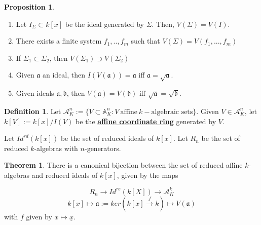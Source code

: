 \documentclass{article}
\theoremstyle{definition}
\newtheorem{theorem}{Theorem}[section]
\theoremstyle{definition}
\newtheorem{definition}{Definition}[theorem]
\theoremstyle{definition}
\theoremstyle{definition}
\newtheorem{proposition}{Proposition}[theorem]
\theoremstyle{definition}
\theoremstyle{definition}
\theoremstyle{definition}
\begin{document}
\begin{tcolorbox}[colback=blue!5!white,colframe=blue!30!white]
\begin{proposition}
    \begin{enumerate}
        \item   Let $I_{\Sigma}\subset k[x]$ be the ideal generated by $\Sigma$. Then, $V(\Sigma)=V(I)$. 
        \item There exists a finite system $f_1,..,f_m$ such that $V(\Sigma)=V(f_1,...,f_m)$
        \item If $\Sigma_1\subset \Sigma_2$, then $V(\Sigma_1)\supset V(\Sigma_2)$
        \item Given $\mathfrak{a}$ an ideal, then $I(V(\mathfrak{a}))=\mathfrak{a}$ iff $\mathfrak{a}=\sqrt{\mathfrak{a}}$.
        \item Given ideals $\mathfrak{a},\mathfrak{b}$, then $V(\mathfrak{a})=V(\mathfrak{b})$ iff $\sqrt{\mathfrak{a}}=\sqrt{\mathfrak{b}}$.  
    \end{enumerate}
  
\end{proposition}
\end{tcolorbox}



\begin{tcolorbox}[colback=purple!5!white,colframe=purple!75!black]
\begin{definition}
Let $\mathcal{A}_K^n:=\{ V\subset \mathbb{A}_K^n: V \ \textrm{affine} \ k- \textrm{algebraic sets}  \}$. Given $V\in \mathcal{A}_K^n$, let $k[V]:=k[x]/I(V)$ be the \underline{\textbf{affine coordinate ring}} generated by $V$. 
\end{definition}
\end{tcolorbox}

Let $Id^{rd}(k[x])$ be the set of reduced ideals of $k[x]$. Let $R_n$ be the set of reduced $k$-algebras with $n$-generators.


\begin{tcolorbox}[colback=red!5!white,colframe=red!30!white]
\begin{theorem}
There is a canonical bijection between the set of reduced affine $k$-algebras and reduced ideals of $k[x]$, given by the maps

\[R_n\to Id^{re}(k[X])\to \mathcal{A}^k_K\]
\[k[\underline{x}]\mapsto \mathfrak{a}:=ker(k[x]\xrightarrow{f} k)\mapsto V(\mathfrak{a})\]
with $f$ given by $x\mapsto \underline{x}$. 
\end{theorem}
\end{tcolorbox}
\end{document}
